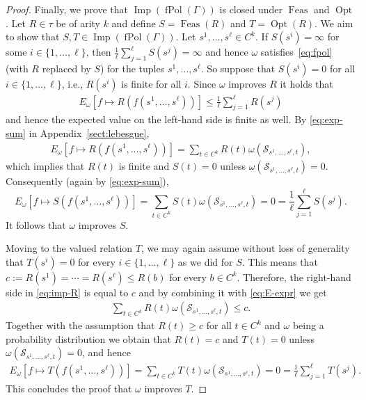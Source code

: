 \documentclass[nonacm]{acmart}
\DeclareMathOperator{\Imp}{Imp}
\DeclareMathOperator{\fPol}{fPol}
\DeclareMathOperator{\Opt}{Opt}
\DeclareMathOperator{\Feas}{Feas}
\begin{document}
\begin{proof}
 Finally, we prove that $\Imp(\fPol(\Gamma))$ is closed under $\Feas$ and $\Opt$. 
 Let $R \in \tau$ be of arity $k$ and define $S= \Feas(R)$ and $T = \Opt(R)$. We aim to show that $S, T \in \Imp(\fPol(\Gamma))$. Let $s^1,\dots,s^{\ell} \in C^k$.
 If $S(s^i) = \infty$ for some $i \in \{1,\dots,\ell\}$,
 then $\frac{1}{\ell} \sum_{j = 1}^{\ell} S(s^j) = \infty$ 
 and hence $\omega$ satisfies~\eqref{eq:fpol} (with $R$ replaced by $S$) for the tuples $s^1,\dots,s^{\ell}$.
So suppose that $S(s^i) = 0$ for all $i \in \{1,\dots,\ell\}$, i.e., $R(s^i)$ is finite for all $i$. Since $\omega$ improves $R$ it holds that
\begin{align}\label{eq:imp-R}
E_\omega[f \mapsto R(f(s^1,\dots,s^{\ell}))]
\leq \frac{1}{\ell} \sum_{j = 1}^{\ell} R(s^j) 
\end{align}
and hence the expected value on the left-hand side is finite as well.
By \eqref{eq:exp-sum} in Appendix~\ref{sect:lebesgue},
\begin{align}\label{eq:E-expr}
E_\omega[f \mapsto R(f(s^1,\dots,s^{\ell}))] =  \sum_{t \in C^k} R(t) \omega({\mathscr S}_{s^1,\dots,s^{\ell}, t}),
\end{align}
which implies that $R(t)$ is finite and $S(t)=0$ unless $\omega({\mathscr S}_{s^1,\dots,s^{\ell}, t})=0$. Consequently (again by \eqref{eq:exp-sum}),
\begin{equation*}
E_\omega[f \mapsto S(f(s^1,\dots,s^{\ell}))]
= \sum_{t \in C^k} S(t) \omega({\mathscr S}_{s^1,\dots,s^{\ell}, t}) = 0 = \frac{1}{\ell} \sum_{j = 1}^{\ell} S(s^j). 
\end{equation*}
It follows that $\omega$ improves $S$.

Moving to the valued relation $T$, we may again assume without loss of generality that $T(s^i)=0$ for every $i \in \{1, \dots, \ell\}$ as we did for $S$. This means that $c := R(s^1) = \cdots = R(s^\ell) \leq R(b)$ for every $b \in C^k$. 
Therefore, the right-hand side in \eqref{eq:imp-R} is equal to $c$ and by combining it with \eqref{eq:E-expr} we get 
\begin{align*}
    \sum_{t \in C^k} R(t) \omega({\mathscr S}_{s^1,\dots,s^{\ell}, t}) \leq c.
\end{align*}
Together with the assumption that $R(t) \geq c$ for all $t \in C^k$ and $\omega$ being a probability distribution we obtain that $R(t) = c$ and $T(t) = 0$ unless $\omega({\mathscr S}_{s^1,\dots,s^{\ell}, t}) = 0$, and hence  
\begin{align*}
E_\omega[f \mapsto T(f(s^1,\dots,s^{\ell}))]
= \sum_{t \in C^k} T(t) \omega({\mathscr S}_{s^1,\dots,s^{\ell}, t}) = 0 = \frac{1}{\ell} \sum_{j = 1}^{\ell} T(s^j).
\end{align*}  
This concludes the proof that $\omega$ improves $T$.
\end{proof}
\end{document}
